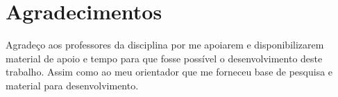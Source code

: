 \documentclass[conference]{IEEEtran}
\begin{document}
\section*{Agradecimentos}
Agradeço aos professores da disciplina por me apoiarem e disponibilizarem material de apoio e tempo para que fosse possível o desenvolvimento deste trabalho. Assim como ao meu orientador que me forneceu base de pesquisa e material para desenvolvimento.







\nocite{*}
\end{document}
